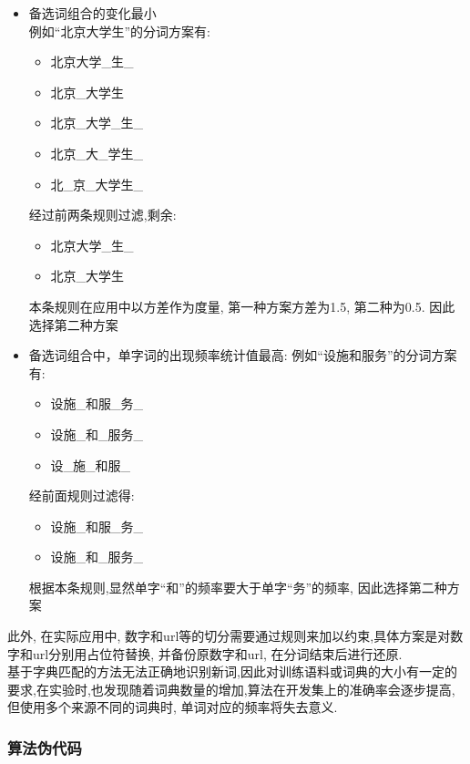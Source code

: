 \documentclass[titlepage]{article}
\begin{document}
\begin{itemize}
\item 备选词组合的变化最小\\[1em]
    例如``北京大学生''的分词方案有:
    \begin{itemize}
        \item 北京大学\_生\_
        \item 北京\_大学生
        \item 北京\_大学\_生\_
        \item 北京\_大\_学生\_
        \item 北\_京\_大学生\_
    \end{itemize}
    经过前两条规则过滤,剩余:
    \begin{itemize}
        \item 北京大学\_生\_
        \item 北京\_大学生
    \end{itemize}
    本条规则在应用中以方差作为度量, 第一种方案方差为1.5, 第二种为0.5. 因此选择第二种方案
\item 备选词组合中，单字词的出现频率统计值最高:
    例如``设施和服务''的分词方案有:
    \begin{itemize}
        \item 设施\_和服\_务\_
        \item 设施\_和\_服务\_
        \item 设\_施\_和服\_
    \end{itemize}
    经前面规则过滤得:
    \begin{itemize}
        \item 设施\_和服\_务\_
        \item 设施\_和\_服务\_
    \end{itemize}
    根据本条规则,显然单字``和''的频率要大于单字``务''的频率, 因此选择第二种方案
\end{itemize}

\noindent 此外, 在实际应用中, 数字和url等的切分需要通过规则来加以约束,具体方案是对数字和url分别用占位符替换, 并备份原数字和url, 在分词结束后进行还原.\\[1em] 

\noindent 基于字典匹配的方法无法正确地识别新词,因此对训练语料或词典的大小有一定的要求,在实验时,也发现随着词典数量的增加,算法在开发集上的准确率会逐步提高, 但使用多个来源不同的词典时, 单词对应的频率将失去意义.

\newpage
\subsubsection{算法伪代码}
\end{document}
